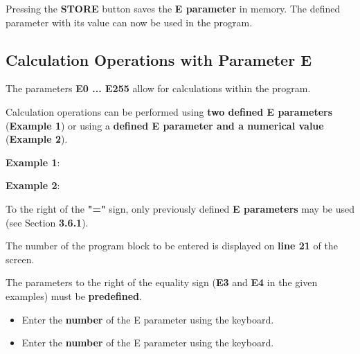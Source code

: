 \vspace{.5cm}

Pressing the \textbf{STORE} button saves the \textbf{E parameter} in memory. The defined parameter with its value can now be used in the program.

\newpage

\subsection{Calculation Operations with Parameter E}

The parameters \textbf{E0 ... E255} allow for calculations within the program.

Calculation operations can be performed using \textbf{two defined E parameters} (\textbf{Example 1}) or using a \textbf{defined E parameter and a numerical value} (\textbf{Example 2}).

\begin{center}
    \textbf{Example 1}: 
    
    \textbf{Example 2}: 
\end{center}

To the right of the \textbf{"="} sign, only previously defined \textbf{E parameters} may be used (see Section \textbf{3.6.1}).

\procedure

The number of the program block to be entered is displayed on \textbf{line 21} of the screen.

The parameters to the right of the equality sign (\textbf{E3} and \textbf{E4} in the given examples) must be \textbf{predefined}.

\begin{itemize}
    \item Enter the \textbf{number} of the E parameter using the keyboard.
    \vspace{.6cm}
    \item Enter the \textbf{number} of the E parameter using the keyboard.
\end{itemize}

